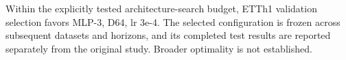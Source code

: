 Within the explicitly tested architecture-search budget, ETTh1 validation selection favors MLP-3, D64, lr 3e-4. The selected configuration is frozen across subsequent datasets and horizons, and its completed test results are reported separately from the original study. Broader optimality is not established.
